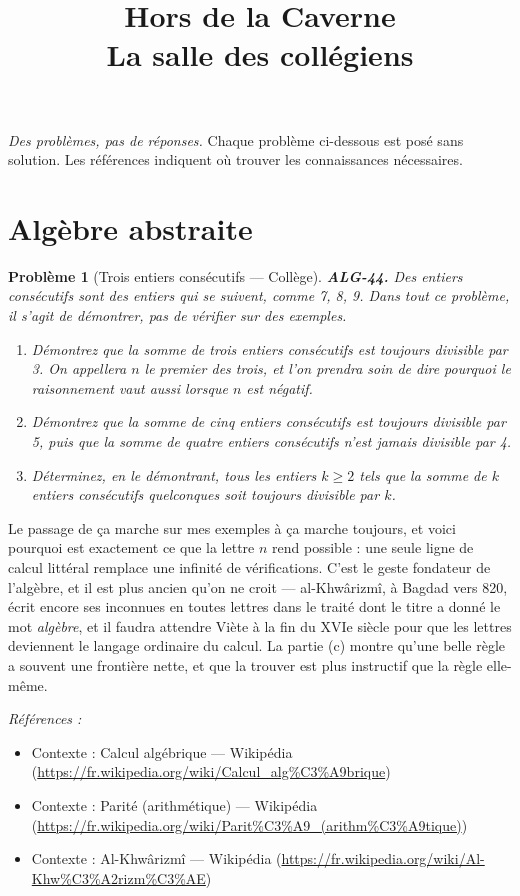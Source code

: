 \documentclass[11pt]{article}
\title{Hors de la Caverne \\ \Large La salle des collégiens}
\author{}
\date{}
\newtheorem{problem}{Problème}
\newenvironment{refs}{\par\small\noindent\emph{Références :}\begin{itemize}\setlength\itemsep{0pt}}{\end{itemize}\normalsize}
\begin{document}
\maketitle
\noindent\emph{Des problèmes, pas de réponses.} Chaque problème ci-dessous est posé
sans solution. Les références indiquent où trouver les connaissances nécessaires.
\medskip


\section*{Algèbre abstraite}

\begin{problem}[{Trois entiers consécutifs --- Collège}]
\textbf{ALG-44.} Des entiers consécutifs sont des entiers qui se suivent, comme 7, 8, 9. Dans
tout ce problème, il s'agit de démontrer, pas de vérifier sur des exemples.
\begin{enumerate}
\item[(a)] Démontrez que la somme de trois entiers consécutifs est toujours divisible par 3. On appellera
$ n $ le premier des trois, et l'on prendra soin de dire pourquoi le raisonnement vaut aussi
lorsque $ n $ est négatif.
\item[(b)] Démontrez que la somme de cinq entiers consécutifs est toujours divisible par 5, puis que la
somme de quatre entiers consécutifs n'est jamais divisible par 4.
\item[(c)] Déterminez, en le démontrant, tous les entiers $ k \ge 2 $ tels que la somme de $ k $
entiers consécutifs quelconques soit toujours divisible par $ k $.
\end{enumerate}

\end{problem}

\noindent Le passage de \og{} ça marche sur mes exemples \fg{} à \og{} ça marche toujours, et voici
pourquoi \fg{} est exactement ce que la lettre $ n $ rend possible : une seule ligne de calcul
littéral remplace une infinité de vérifications. C'est le geste fondateur de l'algèbre, et il est
plus ancien qu'on ne croit --- al-Khwârizmî, à Bagdad vers 820, écrit encore ses inconnues en toutes
lettres dans le traité dont le titre a donné le mot \textit{algèbre}, et il faudra attendre Viète à
la fin du XVIe siècle pour que les lettres deviennent le langage ordinaire du calcul.
La partie (c) montre qu'une belle règle a souvent une frontière nette, et que la trouver est plus
instructif que la règle elle-même.

\begin{refs}
\item Contexte : Calcul algébrique --- Wikipédia (\url{https://fr.wikipedia.org/wiki/Calcul_alg%C3%A9brique})
\item Contexte : Parité (arithmétique) --- Wikipédia (\url{https://fr.wikipedia.org/wiki/Parit%C3%A9_(arithm%C3%A9tique)})
\item Contexte : Al-Khwârizmî --- Wikipédia (\url{https://fr.wikipedia.org/wiki/Al-Khw%C3%A2rizm%C3%AE})
\end{refs}
\end{document}

